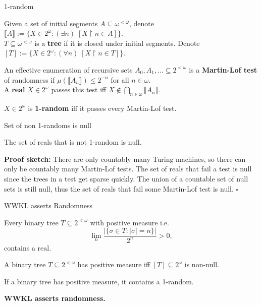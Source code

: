 \begin{frame}{1-random}
  \begin{notation*}
    Given a set of initial segments $A\subseteq\omega^{<\omega}$, denote
    $\llbracket A\rrbracket:= \{X\in2^\omega: (\exists n)\;
    [X\restriction n \in A]\}$.\\
    \vspace{0.5em}
    $T\subseteq\omega^{<\omega}$ is a \textbf{tree} if it is closed under
    initial segments. Denote $[T]:= \{X\in2^\omega: (\forall n)\;
    [X\restriction n \in T]\}$.
  \end{notation*}

  \begin{define*}
    An effective enumeration of recursive sets
    $A_0,A_1,\ldots \subseteq 2^{<\omega}$ is a \textbf{Martin-Lof test} of
    randomness if $\mu(\llbracket A_n\rrbracket) \leq 2^{-n}$ for all
    $n\in\omega$.\\
    \vspace{0.5em}
    A \textbf{real} $X\in2^\omega$ passes this test iff $X\not\in
    \bigcap_{n\in\omega} \llbracket A_n\rrbracket$.
  \end{define*}

  \begin{define*}
    $X\in2^\omega$ is \textbf{1-random} iff it passes every Martin-Lof
    test.
  \end{define*}
\end{frame}

\begin{frame}{Set of non 1-randoms is null}
  \begin{fact*}
    The set of reals that is not 1-random is null.
  \end{fact*}

  \vspace{2em}
  \textbf{Proof sketch:} There are only countably many Turing machines, so
  there can only be countably many Martin-Lof tests. The set of reals that
  fail a test is null since the trees in a test get sparse quickly. The
  union of a countable set of null sets is still null, thus the set of
  reals that fail some Martin-Lof test is null. $\square$
\end{frame}

\begin{frame}{WWKL asserts Randomness}
  \begin{thm*}
    Every binary tree $T\subseteq 2^{<\omega}$ with positive measure i.e.
    \[\lim_n \frac{|\{\sigma\in T: |\sigma|=n\}|}{2^n} >0,\]
    contains a real.
  \end{thm*}
  \begin{fact}
    A binary tree $T\subseteq2^{<\omega}$ has positive measure iff
    $[T]\subseteq2^\omega$ is non-null.
  \end{fact}
  \begin{coro}
    If a binary tree has positive measure, it contains a 1-random.
  \end{coro}

  \textbf{WWKL asserts randomness.}
\end{frame}

